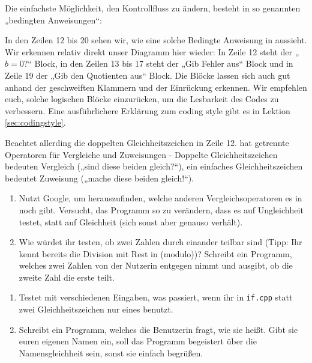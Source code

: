 Die einfachste Möglichkeit, den Kontrollfluss zu ändern, besteht in so
genannten „bedingten Anweisungen“:

In den Zeilen 12 bis 20 sehen wir, wie eine solche Bedingte Anweisung in \Cpp
aussieht. Wir erkennen relativ direkt unser Diagramm hier wieder: In Zeile 12
steht der „$b=0$?“ Block, in den Zeilen 13 bis 17 steht der „Gib Fehler aus“
Block und in Zeile 19 der „Gib den Quotienten aus“ Block. Die Blöcke lassen sich auch gut anhand der geschweiften Klammern und der Einrückung erkennen. Wir empfehlen euch, solche logischen Blöcke einzurücken, um die Lesbarkeit des Codes zu verbessern. Eine ausführlichere Erklärung zum coding style gibt es in Lektion \ref{sec:codingstyle}.

Beachtet allerding die doppelten Gleichheitszeichen in Zeile 12. \Cpp hat
getrennte Operatoren für Vergleiche und Zuweisungen - Doppelte
Gleichheitszeichen bedeuten Vergleich („sind diese beiden gleich?“), ein
einfaches Gleichheitszeichen bedeutet Zuweisung („mache diese beiden gleich!“).

\begin{praxis}
      \begin{enumerate}
            \item Nutzt Google, um herauszufinden, welche anderen Vergleichsoperatoren
                  es in \Cpp noch gibt. Versucht, das Programm so zu verändern, dass es
                  auf Ungleichheit testet, statt auf Gleichheit (sich sonst aber genauso
                  verhält).
            
            \item Wie würdet ihr testen, ob zwei Zahlen durch einander teilbar sind
                  (Tipp: Ihr kennt bereits die Division mit Rest in \Cpp (modulo))?
                  Schreibt ein Programm, welches zwei Zahlen von der Nutzerin entgegen
                  nimmt und ausgibt, ob die zweite Zahl die erste teilt.
      \end{enumerate}
\end{praxis}

\begin{spiel}
\begin{enumerate}
    \item Testet mit verschiedenen Eingaben, was passiert, wenn ihr in
        \texttt{if.cpp} statt zwei Gleichheitszeichen nur eines benutzt.

    \item Schreibt ein Programm, welches die Benutzerin fragt, wie sie heißt.
        Gibt sie euren eigenen Namen ein, soll das Programm begeistert über die
        Namensgleichheit sein, sonst sie einfach begrüßen.
\end{enumerate}
\end{spiel}

